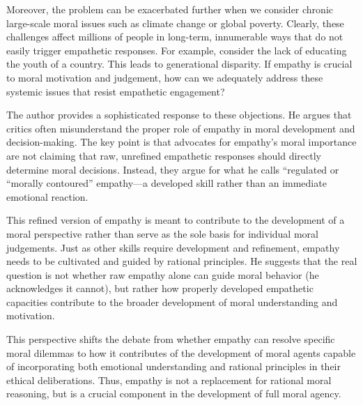\documentclass[11pt]{article}
\begin{document}
Moreover, the problem can be exacerbated further when we consider chronic large-scale moral issues such as climate change or global poverty. Clearly, these challenges affect millions of people in long-term, innumerable ways that do not easily trigger empathetic responses. For example, consider the lack of educating the youth of a country. This leads to generational disparity. If empathy is crucial to moral motivation and judgement, how can we adequately address these systemic issues that resist empathetic engagement? 

The author provides a sophisticated response to these objections. He argues that critics often misunderstand the proper role of empathy in moral development and decision-making. The key point is that advocates for empathy's moral importance are not claiming that raw, unrefined empathetic responses should directly determine moral decisions. Instead, they argue for what he calls “regulated or “morally contoured” empathy—a developed skill rather than an immediate emotional reaction. 

This refined version of empathy is meant to contribute to the development of a moral perspective rather than serve as the sole basis for individual moral judgements. Just as other skills require development and refinement, empathy needs to be cultivated and guided by rational principles. He suggests that the real question is not whether raw empathy alone can guide moral behavior (he acknowledges it cannot), but rather how properly developed empathetic capacities contribute to the broader development of moral understanding and motivation. 

This perspective shifts the debate from whether empathy can resolve specific moral dilemmas to how it contributes of the development of moral agents capable of incorporating both emotional understanding and rational principles in their ethical deliberations. Thus, empathy is not a replacement for rational moral reasoning, but is a crucial component in the development of full moral agency. 
\end{document}
